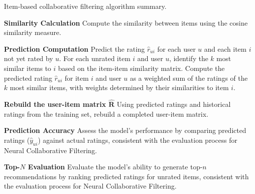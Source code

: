 \begin{algorithm}
    \caption{Item-based collaborative filtering algorithm summary.}
    \label{algo:IBCF}
    \begin{algorithmic}[1]
      \State \textbf{Similarity Calculation}
      \newline \quad Compute the similarity between items using the cosine similarity measure.
        
      \State \textbf{Prediction Computation}
      \newline \quad Predict the rating \(\hat{r}_{ui}\) for each user \(u\) and each item \(i\) not yet rated by \(u\).
      \newline \quad For each unrated item \(i\) and user \(u\), identify the \(k\) most similar items to \(i\) based on the item-item similarity matrix.
      \newline \quad Compute the predicted rating \(\hat{r}_{ui}\) for item \(i\) and user \(u\) as a weighted sum of the ratings of the \(k\) most similar items, with weights determined by their similarities to item \(i\).

    
      \State \textbf{Rebuild the user-item matrix $\hat{\mathbf{R}}$}
      \newline \quad Using predicted ratings and historical ratings from the training set, rebuild a completed user-item matrix.
    
      \State \textbf{Prediction Accuracy}
      \newline \quad Assess the model's performance by comparing predicted ratings ($\hat{y}_{u i}$) against actual ratings, consistent with the evaluation process for Neural Collaborative Filtering.
    
      \State \textbf{Top-$N$ Evaluation}
      \newline \quad Evaluate the model's ability to generate top-$n$ recommendations by ranking predicted ratings for unrated items, consistent with the evaluation process for Neural Collaborative Filtering.
    \end{algorithmic}
    \end{algorithm}
    


